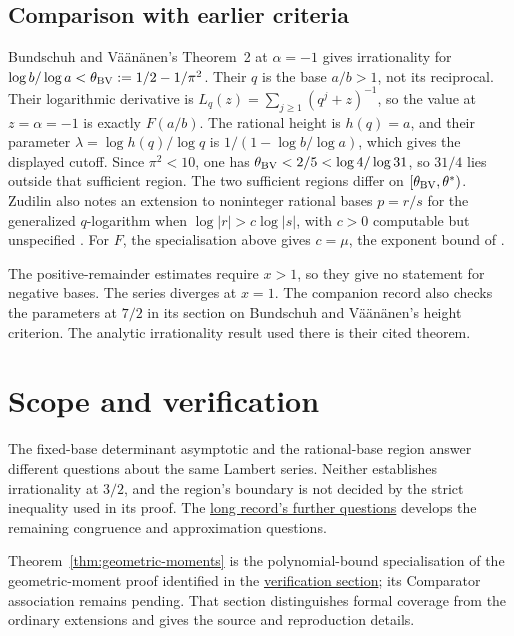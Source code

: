 \documentclass[11pt]{article}
\newcommand{\shortrecordlink}[3]{\href{#1\##2}{#3}}
\begin{document}
\subsection{Comparison with earlier criteria}
Bundschuh and V\"a\"an\"anen's Theorem~2 at $\alpha=-1$
\cite[p.~177]{bv1994} gives irrationality for
$\log b/\log a<\theta_{\rm BV}:=1/2-1/\pi^2$.
Their $q$ is the base $a/b>1$, not its reciprocal. Their logarithmic
derivative is $L_q(z)=\sum_{j\ge1}(q^j+z)^{-1}$, so the value at
$z=\alpha=-1$ is exactly $F(a/b)$. The rational height is $h(q)=a$,
and their parameter $\lambda=\log h(q)/\log q$ is
$1/(1-\log b/\log a)$, which gives the displayed cutoff.
Since $\pi^2<10$, one has $\theta_{\rm BV}<2/5<\log4/\log31$, so $31/4$ lies
outside that sufficient region.  The two sufficient regions differ on
$[\theta_{\rm BV},\theta^*)$.
Zudilin also notes an extension to noninteger rational bases $p=r/s$
for the generalized $q$-logarithm when $\log|r|>c\log|s|$, with $c>0$
computable but unspecified \cite[Sec.~2, p.~4]{zudilin2016}.
For $F$, the specialisation above gives $c=\mu$, the exponent bound
of \cite[p.~162]{zudilin2004}.

The positive-remainder estimates require $x>1$, so they give no
statement for negative bases. The series diverges at $x=1$.
The companion record also checks the parameters at $7/2$ in
its section on Bundschuh and V\"a\"an\"anen's height criterion.
The analytic irrationality result used there is their cited theorem.

\section{Scope and verification}\label{sec:open}
The fixed-base determinant asymptotic and the rational-base region answer
different questions about the same Lambert series. Neither establishes
irrationality at $3/2$, and the region's boundary is not decided by the
strict inequality used in its proof. The
\shortrecordlink{erdos1049-rational-base-lambert-reasoning-surface.pdf}
{scope-further-questions}{long record's further questions} develops the
remaining congruence and approximation questions.

\evidenceparagraph{\evidencerecordurl}
Theorem~\ref{thm:geometric-moments} is the polynomial-bound specialisation
of the geometric-moment proof identified in the
\shortrecordlink{erdos1049-rational-base-lambert-reasoning-surface.pdf}
{scope-verification}{verification section}; its Comparator association
remains pending. That section distinguishes formal coverage from the
ordinary extensions and gives the source and reproduction details.
\end{document}
